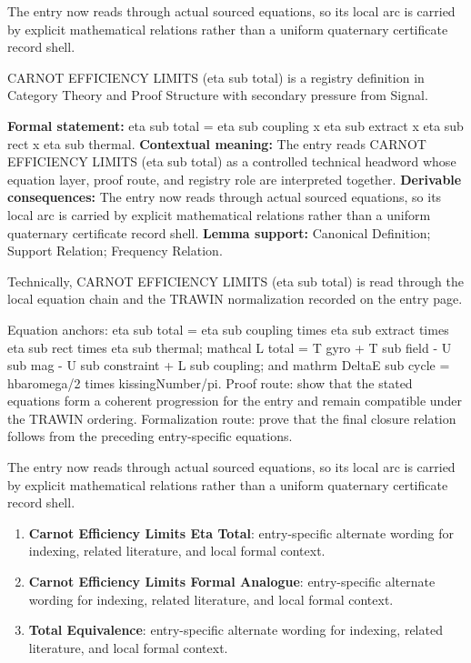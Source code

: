 The entry now reads through actual sourced equations, so its local arc is carried by explicit mathematical relations rather than a uniform quaternary certificate record shell.
\clearpage


\begingroup\small
{}
CARNOT EFFICIENCY LIMITS (eta sub total) is a registry definition in Category Theory and Proof Structure with secondary pressure from Signal.

\begingroup\footnotesize\setlength{\emergencystretch}{3em}\sloppy
\textbf{Formal statement:} eta sub total = eta sub coupling x eta sub extract x eta sub rect x eta sub thermal. \textbf{Contextual meaning:} The entry reads CARNOT EFFICIENCY LIMITS (eta sub total) as a controlled technical headword whose equation layer, proof route, and registry role are interpreted together. \textbf{Derivable consequences:} The entry now reads through actual sourced equations, so its local arc is carried by explicit mathematical relations rather than a uniform quaternary certificate record shell. \textbf{Lemma support:} Canonical Definition; Support Relation; Frequency Relation.\par
\endgroup

Technically, CARNOT EFFICIENCY LIMITS (eta sub total) is read through the local equation chain and the TRAWIN normalization recorded on the entry page.

Equation anchors: eta sub total = eta sub coupling times eta sub extract times eta sub rect times eta sub thermal; mathcal L total = T gyro + T sub field - U sub mag - U sub constraint + L sub coupling; and mathrm DeltaE sub cycle = hbaromega/2 times kissingNumber/pi. Proof route: show that the stated equations form a coherent progression for the entry and remain compatible under the TRAWIN ordering. Formalization route: prove that the final closure relation follows from the preceding entry-specific equations.

The entry now reads through actual sourced equations, so its local arc is carried by explicit mathematical relations rather than a uniform quaternary certificate record shell.
\endgroup

\begin{enumerate}[leftmargin=1.6em,itemsep=6pt,topsep=4pt]
\item \textbf{Carnot Efficiency Limits Eta Total}: entry-specific alternate wording for indexing, related literature, and local formal context.
\item \textbf{Carnot Efficiency Limits Formal Analogue}: entry-specific alternate wording for indexing, related literature, and local formal context.
\item \textbf{Total Equivalence}: entry-specific alternate wording for indexing, related literature, and local formal context.
\end{enumerate}

